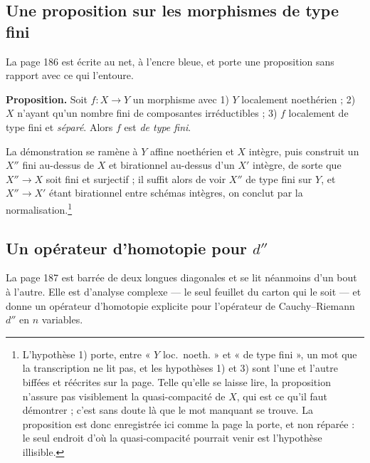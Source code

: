 \documentclass[11pt,a4paper]{article}
\begin{document}
\subsection*{Une proposition sur les morphismes de type fini}

La page 186 est écrite au net, à l'encre bleue, et porte une proposition sans
rapport avec ce qui l'entoure.

\textbf{Proposition.} Soit $f : X \to Y$ un morphisme avec 1) $Y$ localement
noethérien ; 2) $X$ n'ayant qu'un nombre fini de composantes irréductibles ;
3) $f$ localement de type fini et \emph{séparé}. Alors $f$ est \emph{de type
fini}.

La démonstration se ramène à $Y$ affine noethérien et $X$ intègre, puis
construit un $X''$ fini au-dessus de $X$ et birationnel au-dessus d'un $X'$
intègre, de sorte que $X'' \to X$ soit fini et surjectif ; il suffit alors de
voir $X''$ de type fini sur $Y$, et $X'' \to X'$ étant birationnel entre
schémas intègres, on conclut par la normalisation.\footnote{L'hypothèse 1)
porte, entre « $Y$ loc.\ noeth. » et « de type fini », un mot que la
transcription ne lit pas, et les hypothèses 1) et 3) sont l'une et l'autre
biffées et réécrites sur la page. Telle qu'elle se laisse lire, la proposition
n'assure pas visiblement la quasi-compacité de $X$, qui est ce qu'il faut
démontrer ; c'est sans doute là que le mot manquant se trouve. La proposition
est donc enregistrée ici comme la page la porte, et non réparée : le seul
endroit d'où la quasi-compacité pourrait venir est l'hypothèse illisible.}

\subsection*{Un opérateur d'homotopie pour $d''$}

La page 187 est barrée de deux longues diagonales et se lit néanmoins d'un bout
à l'autre. Elle est d'analyse complexe --- le seul feuillet du carton qui le
soit --- et donne un opérateur d'homotopie explicite pour l'opérateur de
Cauchy--Riemann $d''$ en $n$ variables.
\end{document}
